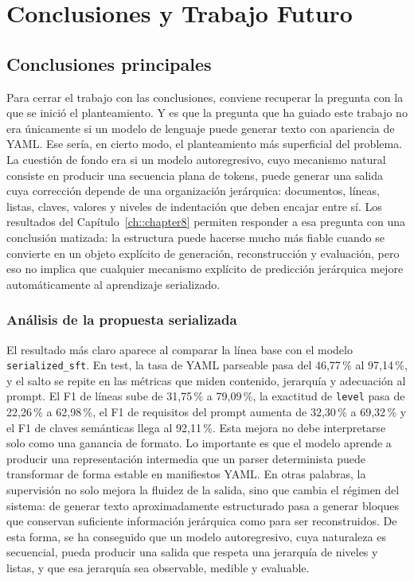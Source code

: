 %
\chapter{Conclusiones y Trabajo Futuro}
\label{ch::chapter10}

\section{Conclusiones principales}
\label{sec:ch10_conclusiones_principales}

Para cerrar el trabajo con las conclusiones, conviene recuperar la pregunta con la que se
inició el planteamiento. Y es que la pregunta que ha guiado este trabajo no era únicamente si un modelo de lenguaje puede
generar texto con apariencia de YAML. Ese sería, en cierto modo, el planteamiento más
superficial del problema. La cuestión de fondo era si un modelo autoregresivo, cuyo
mecanismo natural consiste en producir una secuencia plana de tokens, puede generar una
salida cuya corrección depende de una organización jerárquica: documentos, líneas, listas,
claves, valores y niveles de indentación que deben encajar entre sí. Los resultados del
Capítulo~\ref{ch::chapter8} permiten responder a esa pregunta con una conclusión matizada:
la estructura puede hacerse mucho más fiable cuando se convierte en un objeto explícito de
generación, reconstrucción y evaluación, pero eso no implica que cualquier mecanismo
explícito de predicción jerárquica mejore automáticamente al aprendizaje serializado.

\subsection{Análisis de la propuesta serializada}

El resultado más claro aparece al comparar la línea base con el modelo
\texttt{serialized\_sft}. En test, la tasa de YAML parseable pasa del 46{,}77\,\% al
97{,}14\,\%, y el salto se repite en las métricas que miden contenido, jerarquía y
adecuación al prompt. El F1 de líneas sube de 31{,}75\,\% a 79{,}09\,\%, la exactitud de
\texttt{level} pasa de 22{,}26\,\% a 62{,}98\,\%, el F1 de requisitos del prompt aumenta
de 32{,}30\,\% a 69{,}32\,\% y el F1 de claves semánticas llega al 92{,}11\,\%. Esta
mejora no debe interpretarse solo como una ganancia de formato. Lo importante es que el
modelo aprende a producir una representación intermedia que un parser determinista puede transformar
de forma estable en manifiestos YAML. En otras palabras, la supervisión no solo mejora la
fluidez de la salida, sino que cambia el régimen del sistema: de generar texto
aproximadamente estructurado pasa a generar bloques que conservan suficiente información
jerárquica como para ser reconstruidos. De esta forma, se ha conseguido que un modelo autoregresivo, cuya
naturaleza es secuencial, pueda producir una salida que respeta una jerarquía de niveles y
listas, y que esa jerarquía sea observable, medible y evaluable.

